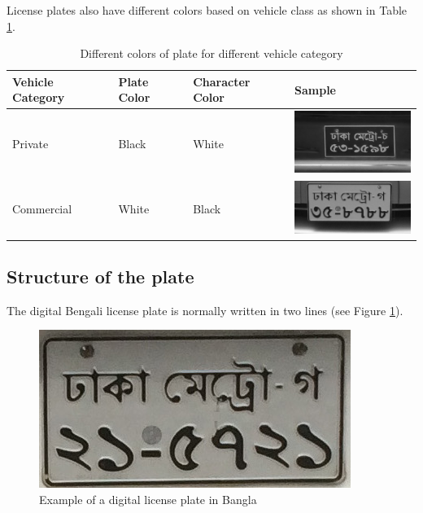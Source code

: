 License plates also have different colors based on vehicle class as shown in Table \ref{tab:colorsByCategory}.
\begin{table}[hb]
	\centering
	\begin{tabular}{|m{3cm}|m{3cm}|m{3cm}|m{4cm}|}
		\hline
		Vehicle Category & Plate Color & Character Color & Sample \\ 
		\hline		    
		Private & Black & White 
		& \includegraphics[width=4cm]{./img/experiment/stage.9/00-private2}
		\\ \hline
		Commercial  & White & Black &
		\includegraphics[width=4cm]{./img/experiment/stage.9/00-good}
		\\ \hline		
	\end{tabular}
	\caption{Different colors of plate for different vehicle category}
	\label{tab:colorsByCategory}
\end{table}





\subsection{Structure of the plate}
The digital Bengali license plate is normally written in two lines (see Figure \ref{fig:EX}).

\begin{figure}
\centering
\includegraphics[scale=0.8]{./img/sample_plate}
\caption{Example of a digital license plate in Bangla}
\label{fig:EX}
\end{figure}

